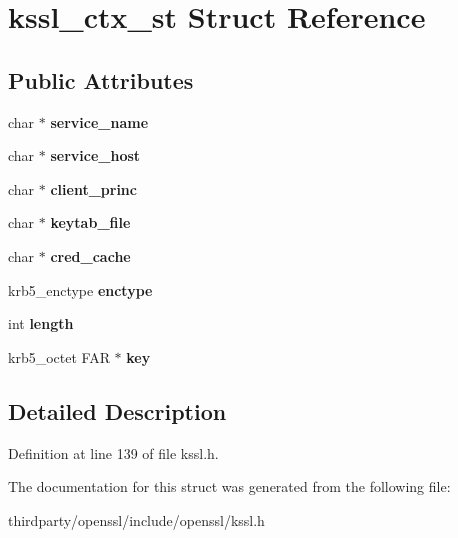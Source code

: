 \hypertarget{structkssl__ctx__st}{}\section{kssl\+\_\+ctx\+\_\+st Struct Reference}
\label{structkssl__ctx__st}
\subsection*{Public Attributes}
\begin{DoxyCompactItemize}
\item 
\mbox{\label{structkssl__ctx__st_aa3718a1a94ac4672f04ca7954a98a223}} 
char $\ast$ {\bfseries service\+\_\+name}
\item 
\mbox{\label{structkssl__ctx__st_a9e935f8bd1ec769ea106132b4f9740a1}} 
char $\ast$ {\bfseries service\+\_\+host}
\item 
\mbox{\label{structkssl__ctx__st_a3f6597936d5553b09f5d1d8884447497}} 
char $\ast$ {\bfseries client\+\_\+princ}
\item 
\mbox{\label{structkssl__ctx__st_a062001f88d34d875c9ff6a6617d50e05}} 
char $\ast$ {\bfseries keytab\+\_\+file}
\item 
\mbox{\label{structkssl__ctx__st_a80431e8d0b576a77f20d4db223ac93ab}} 
char $\ast$ {\bfseries cred\+\_\+cache}
\item 
\mbox{\label{structkssl__ctx__st_a04ef1cbb535de6f76263cf5ab320c44d}} 
krb5\+\_\+enctype {\bfseries enctype}
\item 
\mbox{\label{structkssl__ctx__st_a45cb713dc110c383dbcedff5ab5ddf61}} 
int {\bfseries length}
\item 
\mbox{\label{structkssl__ctx__st_a5732159f66408b496e367b88685835af}} 
krb5\+\_\+octet F\+AR $\ast$ {\bfseries key}
\end{DoxyCompactItemize}


\subsection{Detailed Description}


Definition at line 139 of file kssl.\+h.



The documentation for this struct was generated from the following file\+:\begin{DoxyCompactItemize}
\item 
thirdparty/openssl/include/openssl/kssl.\+h\end{DoxyCompactItemize}
